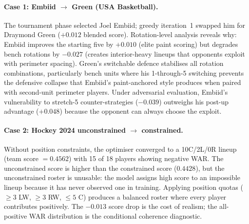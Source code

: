 \documentclass[12pt,letterpaper]{article}
\begin{document}
\paragraph{Case 1: Embiid $\to$ Green (USA Basketball).}
The tournament phase selected Joel Embiid; greedy iteration~1 swapped
him for Draymond Green ($+0.012$ blended score).
Rotation-level analysis reveals why: Embiid improves the starting five
by $+0.010$ (elite paint scoring) but degrades bench rotations by
$-0.027$ (creates interior-heavy lineups that opponents exploit with
perimeter spacing).
Green's switchable defence stabilises all rotation combinations,
particularly bench units where his 1-through-5 switching prevents the
defensive collapse that Embiid's paint-anchored style produces when
paired with second-unit perimeter players.
Under adversarial evaluation, Embiid's vulnerability to stretch-5
counter-strategies ($-0.039$) outweighs his post-up advantage
($+0.048$) because the opponent can always choose the exploit.

\paragraph{Case 2: Hockey 2024 unconstrained $\to$ constrained.}
Without position constraints, the optimiser converged to a 10C/2L/0R
lineup (team score $= 0.4562$) with 15 of 18 players showing negative
WAR.
The unconstrained score is higher than the constrained score ($0.4428$),
but the unconstrained roster is unusable: the model assigns high score
to an impossible lineup because it has never observed one in training.
Applying position quotas ($\geq 3$ LW, $\geq 3$ RW, $\leq 5$ C)
produces a balanced roster where every player contributes positively.
The $-0.013$ score drop is the cost of realism; the all-positive WAR
distribution is the conditional coherence diagnostic.
\end{document}
